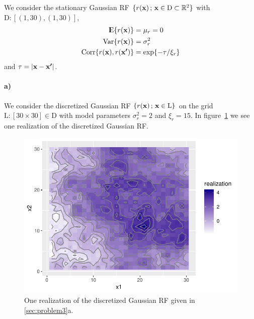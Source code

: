 We consider the stationary Gaussian RF $\{r(\boldsymbol{\mathbf{x}}) \,;\, \boldsymbol{\mathbf{x}} \in \mathrm{D} \subset \mathbb{R}^2\}$ with $\mathrm{D} \colon [(1,30), (1,30)]$,
%
\begin{align*}
    {\rm I\kern-.3em E}\{r(\boldsymbol{\mathbf{x}})\} &= \mu_r = 0 \\
    \mathrm{Var}\{r(\boldsymbol{\mathbf{x}})\} &= \sigma_r^2 \\
    \mathrm{Corr}\{r(\boldsymbol{\mathbf{x}}), r(\boldsymbol{\mathbf{x'}})\} &= \exp\{-\tau/\xi_r\}
\end{align*}
%
and $\tau = |\boldsymbol{\mathbf{x}} - \boldsymbol{\mathbf{x'}}|$.

\paragraph{a)}
We consider the discretized Gaussian RF $\{r(\boldsymbol{\mathbf{x}}) \,;\, \boldsymbol{\mathbf{x}} \in \mathrm{L}\}$ on the grid $\mathrm{L} \colon [30 \times 30] \in \mathrm{D}$ with model parameters $\sigma_r^2=2$ and $\xi_r=15$. In figure~\ref{fig:3a_realization} we see one realization of the discretized Gaussian RF.

\begin{figure}
    \centering
    \includegraphics[scale=0.95]{figures/3a_realization.pdf}
    \caption{One realization of the discretized Gaussian RF given in \ref{sec:problem3}a.}
    \label{fig:3a_realization}
\end{figure}

